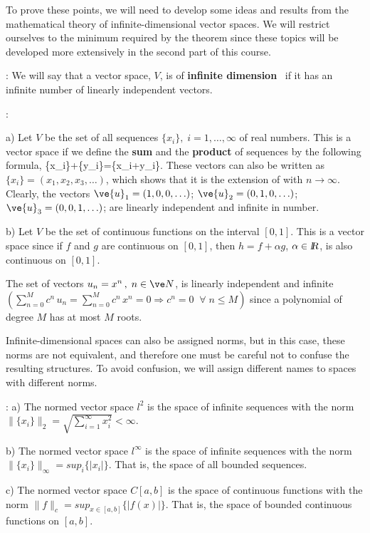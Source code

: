 To prove these points, we will need to develop some ideas and results from the mathematical theory of infinite-dimensional vector spaces. We will restrict ourselves to the minimum required by the theorem since these topics will be developed more extensively in the second part of this course.

\espa
{}: 
We will say that a vector space, $V$, is of
{\bf infinite dimension}~ if it has an infinite number 
of linearly independent vectors.

\noi 
{}:

\noi
a) Let $V$ be the set of all sequences
$\{x_i\},\;i=1,\ldots,\infty$ of real numbers. This is a vector
space if we define the {\bf sum} and the {\bf product} of sequences by 
the following formula,
\beq
\{x_i\}+\alpha\{y_i\}=\{x_i+\alpha\:y_i\}.
\eeq
These vectors can also be written as
$\{x_i\}=(x_1,x_2,x_3,\ldots )$, which shows that it is the
extension of \ren with $n\to\infty$.
Clearly, the vectors $\ve{u}_1=(1,0,0,\ldots) $; $\ve{u}_2=(0,1,0,\ldots) $;
$\ve{u}_3=(0,0,1,\ldots) $; are linearly independent and infinite in number.

\espa

\noi 
b) Let $V$ be the set of continuous functions on the interval
$[0,1]$. This is a vector space since if $f$ and $g$ are
continuous on $[0,1]$, then $h=f+\alpha g$, $\alpha \in \mbox{\sl {l$\!\!\!\;\:\!$R}}$, 
is also continuous on $[0,1]$.

The set of vectors $u_n=x^n\,,\;n\in{\ve N}$, is linearly
independent and infinite
$(\sum^M_{n=0}c^n\,u_n=\sum_{n=0}^Mc^n\,x^n=0\Longrightarrow
c^n=0\;\;\forall \;n\leq  M)$ since a polynomial of degree
$M$ has at most $M$ roots.

Infinite-dimensional spaces can also be assigned
norms, but in this case, these norms are not equivalent, and therefore
one must be careful not to confuse the resulting structures.
To avoid confusion, we will assign different names to spaces with different norms.

\noi{}:
\noi 
a) The normed vector space $l^2$ is the space of
infinite sequences with the norm
$\|\{x_i\}\|_2=\sqrt{\sum_{i=1}^{\infty} x_i^2} < \infty $.

\noi 
b) The normed vector space $l^{\infty}$ is the space of
infinite sequences with the norm
$\|\{x_i\}\|_{\infty}=sup_{i}\{|x_i|\}$. That is, the space of all
bounded sequences.

\noi c) The normed vector space $C[a,b]$ is the space of
continuous functions with the norm $\|f\|_c=sup_{x\in [a,b]}\{|f(x)|\}$.
That is, the space of bounded continuous functions on $[a,b]$.

